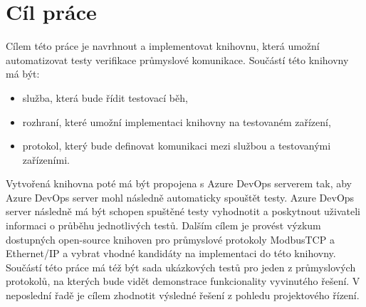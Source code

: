\chapter{Cíl práce}
Cílem této práce je navrhnout a implementovat knihovnu, která umožní automatizovat testy verifikace průmyslové komunikace. 
Součástí této knihovny má být:
\begin{itemize}
    \item služba, která bude řídit testovací běh,
    \item rozhraní, které umožní implementaci knihovny na testovaném zařízení,
    \item protokol, který bude definovat komunikaci mezi službou a testovanými zařízeními.
\end{itemize}
Vytvořená knihovna poté má být propojena s Azure DevOps serverem tak, aby Azure DevOps server mohl následně automaticky spouštět testy. Azure DevOps server následně má být schopen spuštěné testy vyhodnotit a poskytnout uživateli informaci o průběhu jednotlivých testů. 
Dalším cílem je provést výzkum dostupných open-source knihoven pro průmyslové protokoly ModbusTCP a Ethernet/IP a vybrat vhodné kandidáty na implementaci do této knihovny. 
Součástí této práce má též být sada ukázkových testů pro jeden z průmyslových protokolů, na kterých bude 
vidět demonstrace funkcionality vyvinutého řešení. V neposlední řadě je cílem zhodnotit výsledné řešení z 
pohledu projektového řízení.